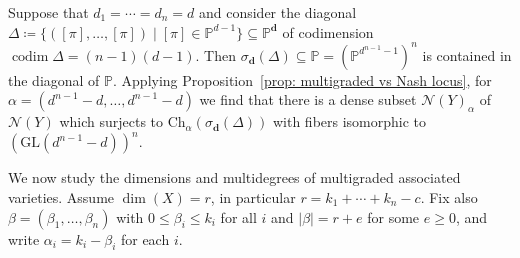\documentclass[12pt]{article}
\theoremstyle{definition}
\newenvironment{example}
{\pushQED{\qed}\renewcommand{\qedsymbol}{$\diamond$}\examplex}
{\popQED\endexamplex}
\newcommand{\PP}{{\mathbb P}}
\def\bd{{\boldsymbol{d}}}
\def\codim{\operatorname{codim}}
\newcommand{\kn}{{\mathcal N}}
\begin{document}
\begin{example}\label{ex: diagonal n-player game equal number of options}
Suppose that $d_1=\cdots=d_n=d$ and consider the diagonal $\Delta\coloneqq\{([\pi],\ldots,[\pi])\mid[\pi]\in\PP^{d-1}\}\subseteq\PP^\bd$ of codimension $\codim\Delta=(n-1)(d-1)$. Then $\sigma_\bd(\Delta)\subseteq\PP=(\PP^{d^{n-1}-1})^n$ is contained in the diagonal of $\PP$. Applying Proposition~\ref{prop: multigraded vs Nash locus}, for $\alpha=(d^{n-1}-d,\ldots,d^{n-1}-d)$ we find that there is a dense subset $\kn(Y)_\alpha$ of $\kn(Y)$ which surjects to $\mathrm{Ch}_\alpha(\sigma_\bd(\Delta))$ with fibers isomorphic to $(\mathrm{GL}(d^{n-1}-d))^n$.
\end{example}

We now study the dimensions and multidegrees of multigraded associated varieties. Assume $\dim(X)=r$, in particular $r=k_1+\cdots+k_n-c$. Fix also $\beta=(\beta_1,\ldots,\beta_n)$ with $0\le \beta_i\le k_i$ for all $i$ and $|\beta| = r + e$ for some $e\ge 0$, and write $\alpha_i = k_i - \beta_i$ for each $i$.
\end{document}
